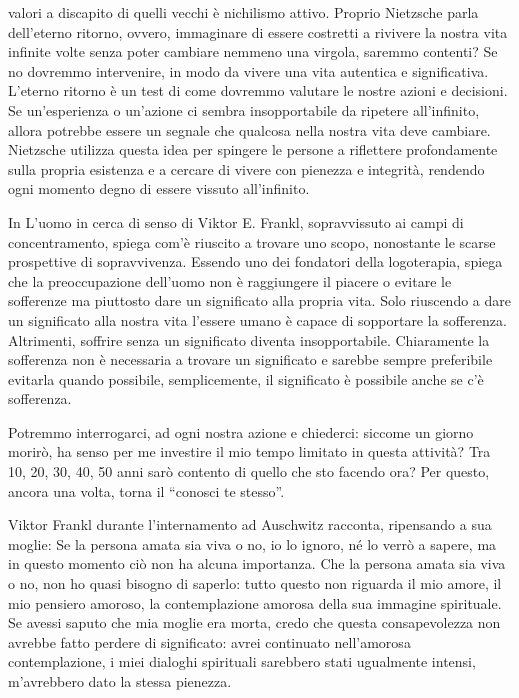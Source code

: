 \documentclass[12pt]{book} %
\begin{document}
valori a discapito di quelli vecchi è nichilismo attivo.
Proprio Nietzsche parla dell'eterno ritorno, ovvero, immaginare di essere costretti a rivivere la nostra vita infinite volte senza poter cambiare nemmeno una virgola, saremmo contenti? Se no dovremmo intervenire, in modo da vivere una vita autentica e significativa. L'eterno ritorno è un test di come dovremmo valutare le nostre azioni e decisioni. Se un'esperienza o un'azione ci sembra insopportabile da ripetere all'infinito, allora potrebbe essere un segnale che qualcosa nella nostra vita deve cambiare. Nietzsche utilizza questa idea per spingere le persone a riflettere profondamente sulla propria esistenza e a cercare di vivere con pienezza e integrità, rendendo ogni momento degno di essere vissuto all'infinito.

In L'uomo in cerca di senso di Viktor E. Frankl, sopravvissuto ai campi di
concentramento, spiega com'è riuscito a trovare uno scopo, nonostante le scarse prospettive di
sopravvivenza. Essendo uno dei fondatori della logoterapia, spiega che la preoccupazione dell'uomo non è raggiungere il
piacere o evitare le sofferenze ma piuttosto dare un significato alla propria vita. Solo riuscendo a dare un
significato alla nostra vita l'essere umano è capace di sopportare la sofferenza. Altrimenti,
soffrire senza un significato diventa insopportabile. Chiaramente la sofferenza non è necessaria a trovare un
significato e sarebbe sempre preferibile evitarla quando possibile, semplicemente, il significato è possibile anche se c'è sofferenza.

Potremmo interrogarci, ad ogni nostra azione e chiederci: siccome un giorno morirò, ha senso per me investire
il mio tempo limitato in questa attività? Tra 10, 20, 30, 40, 50 anni sarò contento di quello che sto facendo ora?
Per questo, ancora una volta, torna il “conosci te stesso”. 

Viktor Frankl durante l'internamento ad Auschwitz racconta, ripensando a sua moglie: Se la persona
amata sia viva o no, io lo ignoro, né lo verrò a sapere, ma in questo momento ciò non ha alcuna importanza. Che la
persona amata sia viva o no, non ho quasi bisogno di saperlo: tutto questo non riguarda il mio amore, il mio pensiero
amoroso, la contemplazione amorosa della sua immagine spirituale. Se avessi saputo che mia moglie era morta, credo che
questa consapevolezza non avrebbe fatto perdere di significato: avrei continuato nell'amorosa contemplazione, i miei dialoghi
spirituali sarebbero stati ugualmente intensi, m'avrebbero dato la stessa pienezza. 
\end{document}
